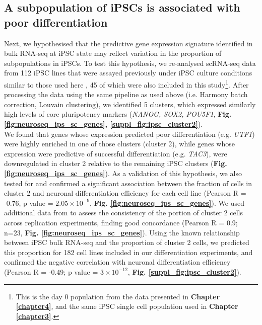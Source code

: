 \newpage

\subsection{A subpopulation of iPSCs is associated with poor differentiation}

Next, 
we hypothesised that the predictive gene expression signature identified in bulk RNA-seq at iPSC state may reflect variation in the proportion of subpopulations in iPSCs. 
To test this hypothesis, we re-analysed scRNA-seq data from 112 iPSC lines that were assayed previously under iPSC culture conditions similar to those used here \cite{cuomo2020single}, 45 of which were also included in this study\footnote{This is the day 0 population from the data presented in \textbf{Chapter \ref{chapter4}}, and the same iPSC single cell population used in \textbf{Chapter \ref{chapter3}}.}. 
After processing the data using the same pipeline as used above (i.e. Harmony batch correction, Louvain clustering),
we identified 5 clusters, 
which expressed similarly high levels of core pluripotency markers (\textit{NANOG, SOX2, POU5F1}, \textbf{Fig. \ref{fig:neuroseq_ips_sc_genes}, \ref{suppl_fig:ipsc_cluster2}}). \\

We found that genes whose expression predicted poor differentiation (e.g. \textit{UTF1}) were highly enriched in one of those clusters (cluster 2), while genes whose expression were predictive of successful differentiation (e.g. \textit{TAC3}), were downregulated in cluster 2 relative to the remaining iPSC clusters (\textbf{Fig. \ref{fig:neuroseq_ips_sc_genes}}). 
As a validation of this hypothesis, we also tested for and confirmed a significant association between the fraction of cells in cluster 2 and neuronal differentiation efficiency for each cell line (Pearson R = -0.76, p value = $2.05 \times 10^{-9}$, \textbf{Fig. \ref{fig:neuroseq_ips_sc_genes}}). 
We used additional data from \cite{cuomo2020single} to assess the consistency of the portion of cluster 2 cells across replication experiments, finding good concordance (Pearson R = 0.9; n=23, \textbf{Fig. \ref{fig:neuroseq_ips_sc_genes}}).
Using the known relationship between iPSC bulk RNA-seq and the proportion of cluster 2 cells, we predicted this proportion for 182 cell lines included in our differentiation experiments, and confirmed the negative correlation with neuronal differentiation efficiency (Pearson R = -0.49; p value = $3 \times 10^{-12}$, \textbf{Fig. \ref{suppl_fig:ipsc_cluster2}}). 
\\

